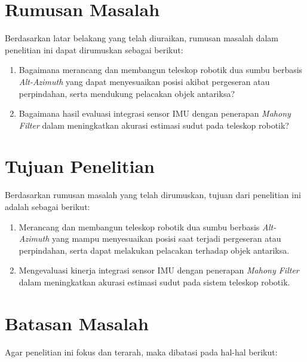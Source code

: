 \section{Rumusan Masalah} \label{I.Rumusan Masalah}
Berdasarkan latar belakang yang telah diuraikan, rumusan masalah dalam penelitian ini dapat dirumuskan sebagai berikut:

\begin{enumerate}[noitemsep]
	\item Bagaimana merancang dan membangun teleskop robotik dua sumbu berbasis \textit{Alt-Azimuth} yang dapat menyesuaikan posisi akibat pergeseran atau perpindahan, serta mendukung pelacakan objek antariksa?
		
	\item Bagaimana hasil evaluasi integrasi sensor IMU dengan penerapan 
	\textit{Mahony Filter} dalam meningkatkan akurasi estimasi sudut pada teleskop robotik?
\end{enumerate}



\section{Tujuan Penelitian} \label{I.Tujuan Penelitian}
Berdasarkan rumusan masalah yang telah dirumuskan, tujuan dari penelitian ini adalah sebagai berikut:

\begin{enumerate}[noitemsep]
	\item Merancang dan membangun teleskop robotik dua sumbu berbasis \textit{Alt-Azimuth} yang mampu menyesuaikan posisi saat terjadi pergeseran atau perpindahan, serta dapat melakukan pelacakan terhadap objek antariksa.
	
	\item Mengevaluasi kinerja integrasi sensor IMU dengan penerapan \textit{Mahony Filter} dalam meningkatkan akurasi estimasi sudut pada sistem teleskop robotik.
\end{enumerate}





\section{Batasan Masalah} \label{I.Batasan}
Agar penelitian ini fokus dan terarah, maka dibatasi pada hal-hal berikut:

